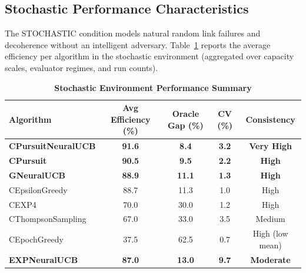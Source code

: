 \documentclass[12pt,a4paper]{article}
\newcommand{\stochastic}[1]{\textcolor{stochasticcolor}{\textbf{#1}}}
\newcommand{\legacy}[1]{\textcolor{legacycolor}{\textbf{#1}}}
\newcommand{\neural}[1]{\textcolor{neuralcolor}{\textbf{#1}}}
\begin{document}
\begin{tcolorbox}[colback=stochasticcolor!10,colframe=stochasticcolor,title=\textbf{Stochastic Environment Deep Analysis (1$\times$–2$\times$ Capacities, T/Tb Combined)}]

\subsection{Stochastic Performance Characteristics}

The STOCHASTIC condition models natural random link failures and decoherence without an intelligent adversary. Table~\ref{tab:stoch-performance} reports the average efficiency per algorithm in the stochastic environment (aggregated over capacity scales, evaluator regimes, and run counts).

\begin{table}[H]
\centering
\caption{\stochastic{Stochastic Environment Performance Summary}}
\label{tab:stoch-performance}
\begin{tabular}{|l|c|c|c|c|}
\hline
\textbf{Algorithm} & \textbf{Avg Efficiency (\%)} & \textbf{Oracle Gap (\%)} & \textbf{CV (\%)} & \textbf{Consistency} \\
\hline
\hline
\neural{CPursuitNeuralUCB}   & \neural{\textbf{91.6}} & \neural{8.4}      & \neural{3.2}     & \neural{Very High} \\
\stochastic{CPursuit}        & \stochastic{\textbf{90.5}} & \stochastic{9.5}  & \stochastic{2.2} & \stochastic{High} \\
\neural{GNeuralUCB}          & \neural{\textbf{88.9}} & \neural{11.1}     & \neural{1.3}     & \neural{High} \\
CEpsilonGreedy               & 88.7                        & 11.3              & 1.0              & High \\
CEXP4                        & 70.0                        & 30.0              & 1.2              & High \\
CThompsonSampling            & 67.0                        & 33.0              & 3.5              & Medium \\
CEpochGreedy                 & 37.5                        & 62.5              & 0.7              & High (low mean) \\
\legacy{EXPNeuralUCB}        & \legacy{87.0}               & \legacy{13.0}     & \legacy{9.7}     & \legacy{Moderate} \\
\hline
\end{tabular}
\end{table}


\end{tcolorbox}
\end{document}

